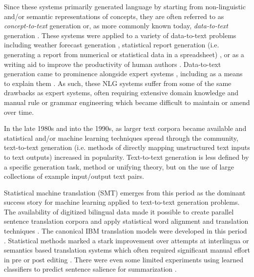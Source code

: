 Since these systems primarily generated language by starting from
non-linguistic and/or semantic representations of concepts, they are often
referred to as \textit{concept-to-text} generation or, as more commonly known
today, \textit{data-to-text} generation \citep{gatt2018survey}. These systems
were applied to a variety of data-to-text problems including weather forecast
generation \citep{goldberg1994using}, statistical report  generation (i.e.
generating a report from numerical or statistical data in a spreadsheet)
\citep{iordanskaja-etal-1992-generation}, or as a writing aid to improve the
productivity of human authors \citep{springer1991,mckeown1994,paris1995}.
Data-to-text generation came to prominence alongside expert systems
\citep{todd1992introduction}, including as a means to explain them
\citep{swartout1983xplain}.  As such, these NLG systems suffer from some of
the same drawbacks as expert systems, often requiring extensive domain
knowledge and manual rule or grammar engineering which became  difficult to
maintain or amend over time.
  
In the late 1980s and into the 1990s, as larger text corpora became available
and statistical and/or machine learning techniques spread through the
community, text-to-text generation (i.e. methods of directly mapping
unstructured text inputs to text outputs) increased in popularity.
Text-to-text generation is less defined by a specific generation task, method
or unifying theory, but on the use of large collections of example
input/output text pairs. 
  
Statistical machine translation (SMT) emerges from this period as the dominant
success story for machine learning applied to text-to-text generation
problems.  The availability of digitized bilingual data made it possible to
create parallel sentence translation corpora and apply statistical word
alignment and translation techniques \citep{gale1993}.  The canonical IBM
translation models were developed in this period \citep{brown1988,brown1993}.
Statistical methods marked a stark improvement over attempts at interlingua or
semantics based translation systems which often required significant manual
effort in pre or post editing \citep{hutchins1994}. There were even some
limited experiments using learned classifiers to predict sentence salience for
summarization \citep{kupiec1995trainable}.
